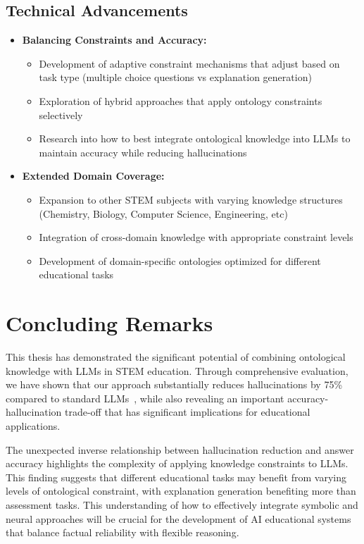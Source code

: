 \subsection{Technical Advancements}
\begin{itemize}
    \item \textbf{Balancing Constraints and Accuracy:} 
        \begin{itemize}
            \item Development of adaptive constraint mechanisms that adjust based on task type (multiple choice questions vs explanation generation)
            \item Exploration of hybrid approaches that apply ontology constraints selectively
            \item Research into how to best integrate ontological knowledge into LLMs to maintain accuracy while reducing hallucinations
        \end{itemize}
    
    \item \textbf{Extended Domain Coverage:} 
        \begin{itemize}
            \item Expansion to other STEM subjects with varying knowledge structures (Chemistry, Biology, Computer Science, Engineering, etc)
            \item Integration of cross-domain knowledge with appropriate constraint levels
            \item Development of domain-specific ontologies optimized for different educational tasks
        \end{itemize}
\end{itemize}

\section{Concluding Remarks}
\label{sec:concluding-remarks}

This thesis has demonstrated the significant potential of combining ontological knowledge with LLMs in STEM education. Through comprehensive evaluation, we have shown that our approach substantially reduces hallucinations by 75\% compared to standard LLMs~\cite{rivera2024impact}, while also revealing an important accuracy-hallucination trade-off that has significant implications for educational applications.

The unexpected inverse relationship between hallucination reduction and answer accuracy highlights the complexity of applying knowledge constraints to LLMs. This finding suggests that different educational tasks may benefit from varying levels of ontological constraint, with explanation generation benefiting more than assessment tasks. This understanding of how to effectively integrate symbolic and neural approaches will be crucial for the development of AI educational systems that balance factual reliability with flexible reasoning.

